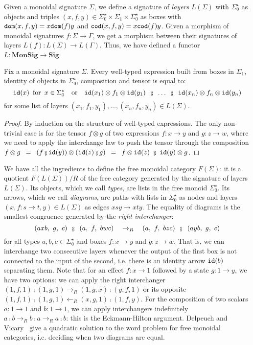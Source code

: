 \begin{definition}
Given a monoidal signature $\Sigma$, we define a signature of \emph{layers} $L(\Sigma)$ with $\Sigma_0^\star$ as objects and triples $(x, f, y) \in \Sigma_0^\star \times \Sigma_1 \times \Sigma_0^\star$ as boxes with $\mathtt{dom}(x, f, y) = x \mathtt{dom}(f) y$ and $\mathtt{cod}(x, f, y) = x \mathtt{cod}(f) y$.
Given a morphism of monoidal signatures $f : \Sigma \to \Gamma$, we get a morphism between their signatures of layers $L(f) : L(\Sigma) \to L(\Gamma)$.
Thus, we have defined a functor $L : \mathbf{MonSig} \to \mathbf{Sig}$.
\end{definition}

\begin{lemma}
Fix a monoidal signature $\Sigma$.
Every well-typed expression built from boxes in $\Sigma_1$, identity of objects in $\Sigma_0^\star$, composition and tensor is equal to:
$$
\id(x) \s \text{for} \s x \in \Sigma_0^\star \quad \text{or} \quad
\id(x_1) \otimes f_1 \otimes \id(y_1)
\s \fcmp \s \dots \s \fcmp \s
\id(x_n) \otimes f_n \otimes \id(y_n)$$
for some list of layers $(x_1, f_1, y_1), \dots, (x_n, f_n, y_n) \in L(\Sigma)$.
\end{lemma}

\begin{proof}
By induction on the structure of well-typed expressions.
The only non-trivial case is for the tensor $f \otimes g$ of two expressions $f : x \to y$ and $g : z \to w$, where we need to apply the interchange law to push the tensor through the composition $f \otimes g \s = \s (f \fcmp \id(y)) \otimes (\id(z) \fcmp g) \s = \s f \otimes \id(z) \ \fcmp \ \id(y) \otimes g$.
\end{proof}

We have all the ingredients to define the free monoidal category $F(\Sigma)$: it is a quotient $F(L(\Sigma)) / R$ of the free category generated by the signature of layers $L(\Sigma)$.
Its objects, which we call \emph{types}, are lists in the free monoid $\Sigma_0^\star$.
Its arrows, which we call \emph{diagrams}, are paths with lists in $\Sigma_0^\star$ as nodes and layers $(x, f : s \to t, y) \in L(\Sigma)$ as edges $x s y \to x t y$.
The equality of diagrams is the smallest congruence generated by the \emph{right interchanger}:
$$
(a x b, \ g, \ c) \s \fcmp \s (a, \ f, \ b w c)
\quad \to_R \quad
(a, \ f, \ b z c) \s \fcmp \s (a y b, \ g, \ c)
$$
for all types $a, b, c \in \Sigma_0^\star$ and boxes $f : x \to y$ and $g : z \to w$.
That is, we can interchange two consecutive layers whenever the output of the first box is not connected to the input of the second, i.e. there is an identity arrow $\mathtt{id}(b)$ separating them.
Note that for an effect $f : x \to 1$ followed by a state $g : 1 \to y$, we have two options: we can apply the right interchanger $(1, f, 1) \fcmp (1, g, 1) \to_R (1, g, x) \fcmp (y, f, 1)$ or its opposite $(1, f, 1) \fcmp (1, g, 1) \leftarrow_R (x, g, 1) \fcmp (1, f, y)$.
For the composition of two scalars $a : 1 \to 1$ and $b : 1 \to 1$, we can apply interchangers indefinitely $a \fcmp b \to_R b \fcmp a \to_R a \fcmp b$: this is the Eckmann-Hilton argument.
Delpeuch and Vicary~\cite{DelpeuchVicary18} give a quadratic solution to the word problem for free monoidal categories, i.e. deciding when two diagrams are equal.


